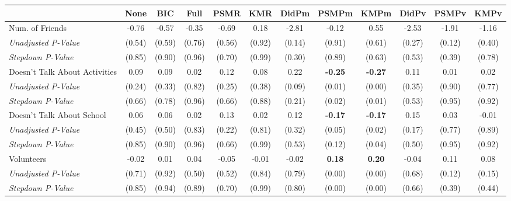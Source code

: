 \begin{tabular}{l c c c c c c c c c c c}
\toprule
 & None & BIC & Full & PSMR & KMR & DidPm & PSMPm & KMPm & DidPv & PSMPv & KMPv \\
\midrule
Num. of Friends & -0.76 & -0.57 & -0.35 & -0.69 & 0.18 & -2.81 & -0.12 & 0.55 & -2.53 & -1.91 & -1.16 \\
\quad \textit{Unadjusted P-Value} & (0.54) & (0.59) & (0.76) & (0.56) & (0.92) & (0.14) & (0.91) & (0.61) & (0.27) & (0.12) & (0.40) \\
\quad \textit{Stepdown P-Value} & (0.85) & (0.90) & (0.96) & (0.70) & (0.99) & (0.30) & (0.89) & (0.63) & (0.53) & (0.39) & (0.78) \\
Doesn't Talk About Activities & 0.09 & 0.09 & 0.02 & 0.12 & 0.08 & 0.22 & \textbf{ -0.25 } & \textbf{ -0.27 } & 0.11 & 0.01 & 0.02 \\
\quad \textit{Unadjusted P-Value} & (0.24) & (0.33) & (0.82) & (0.25) & (0.38) & (0.09) & (0.01) & (0.00) & (0.35) & (0.90) & (0.77) \\
\quad \textit{Stepdown P-Value} & (0.66) & (0.78) & (0.96) & (0.66) & (0.88) & (0.21) & (0.02) & (0.01) & (0.53) & (0.95) & (0.92) \\
Doesn't Talk About School & 0.06 & 0.06 & 0.02 & 0.13 & 0.02 & 0.12 & \textbf{ -0.17 } & \textbf{ -0.17 } & 0.15 & 0.03 & -0.01 \\
\quad \textit{Unadjusted P-Value} & (0.45) & (0.50) & (0.83) & (0.22) & (0.81) & (0.32) & (0.05) & (0.02) & (0.17) & (0.77) & (0.89) \\
\quad \textit{Stepdown P-Value} & (0.85) & (0.90) & (0.96) & (0.66) & (0.99) & (0.53) & (0.12) & (0.04) & (0.50) & (0.95) & (0.92) \\
Volunteers & -0.02 & 0.01 & 0.04 & -0.05 & -0.01 & -0.02 & \textbf{ 0.18 } & \textbf{ 0.20 } & -0.04 & 0.11 & 0.08 \\
\quad \textit{Unadjusted P-Value} & (0.71) & (0.92) & (0.50) & (0.52) & (0.84) & (0.79) & (0.00) & (0.00) & (0.68) & (0.12) & (0.15) \\
\quad \textit{Stepdown P-Value} & (0.85) & (0.94) & (0.89) & (0.70) & (0.99) & (0.80) & (0.00) & (0.00) & (0.66) & (0.39) & (0.44) \\
\bottomrule
\end{tabular}

